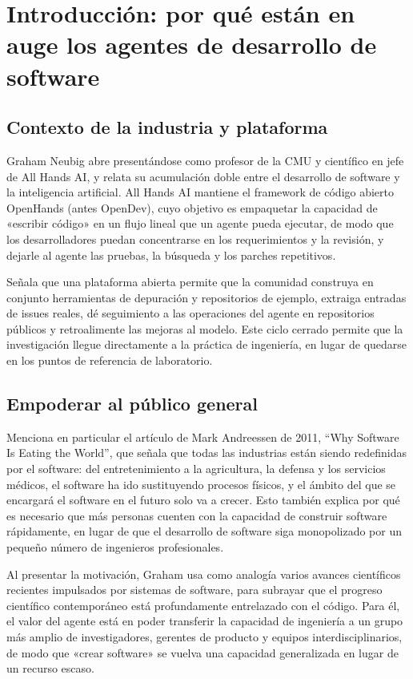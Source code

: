 \section{Introducción: por qué están en auge los agentes de desarrollo de software}
\subsection{Contexto de la industria y plataforma}
Graham Neubig abre presentándose como profesor de la CMU y científico en jefe de All Hands AI, y relata su acumulación doble entre el desarrollo de software y la inteligencia artificial. All Hands AI mantiene el framework de código abierto OpenHands (antes OpenDev), cuyo objetivo es empaquetar la capacidad de «escribir código» en un flujo lineal que un agente pueda ejecutar, de modo que los desarrolladores puedan concentrarse en los requerimientos y la revisión, y dejarle al agente las pruebas, la búsqueda y los parches repetitivos.

Señala que una plataforma abierta permite que la comunidad construya en conjunto herramientas de depuración y repositorios de ejemplo, extraiga entradas de issues reales, dé seguimiento a las operaciones del agente en repositorios públicos y retroalimente las mejoras al modelo. Este ciclo cerrado permite que la investigación llegue directamente a la práctica de ingeniería, en lugar de quedarse en los puntos de referencia de laboratorio.

\subsection{Empoderar al público general}
Menciona en particular el artículo de Mark Andreessen de 2011, ``Why Software Is Eating the World'', que señala que todas las industrias están siendo redefinidas por el software: del entretenimiento a la agricultura, la defensa y los servicios médicos, el software ha ido sustituyendo procesos físicos, y el ámbito del que se encargará el software en el futuro solo va a crecer. Esto también explica por qué es necesario que más personas cuenten con la capacidad de construir software rápidamente, en lugar de que el desarrollo de software siga monopolizado por un pequeño número de ingenieros profesionales.

Al presentar la motivación, Graham usa como analogía varios avances científicos recientes impulsados por sistemas de software, para subrayar que el progreso científico contemporáneo está profundamente entrelazado con el código. Para él, el valor del agente está en poder transferir la capacidad de ingeniería a un grupo más amplio de investigadores, gerentes de producto y equipos interdisciplinarios, de modo que «crear software» se vuelva una capacidad generalizada en lugar de un recurso escaso.

